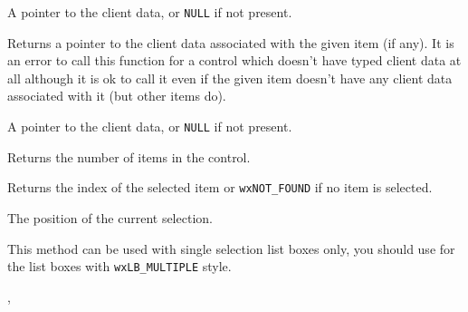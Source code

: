 
A pointer to the client data, or {\tt NULL} if not present.


\label{wxcontrolwithitemsgetclientobject}


Returns a pointer to the client data associated with the given item (if any).
It is an error to call this function for a control which doesn't have typed
client data at all although it is ok to call it even if the given item doesn't
have any client data associated with it (but other items do).




A pointer to the client data, or {\tt NULL} if not present.


\label{wxcontrolwithitemsgetcount}


Returns the number of items in the control.




\label{wxcontrolwithitemsgetselection}


Returns the index of the selected item or {\tt wxNOT\_FOUND} if no item is
selected.


The position of the current selection.


This method can be used with single selection list boxes only, you should use
 for the list boxes
with {\tt wxLB\_MULTIPLE} style.


,\rtfsp
{}


\label{wxcontrolwithitemsgetstring}

